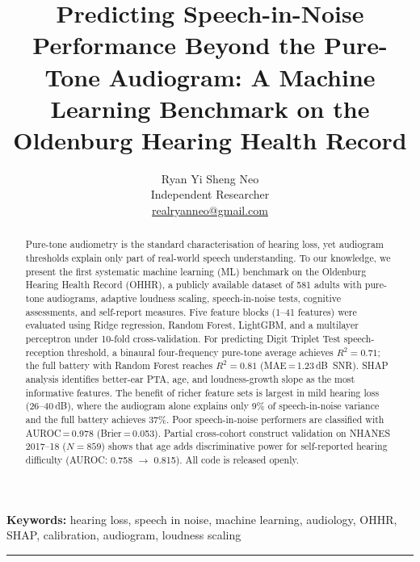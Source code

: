 \documentclass[12pt,a4paper]{article}
\begin{document}
\title{\textbf{Predicting Speech-in-Noise Performance Beyond the Pure-Tone
Audiogram: A Machine Learning Benchmark on the Oldenburg Hearing Health
Record}}

\author{Ryan Yi Sheng Neo\\[0.4em]
\small Independent Researcher\\[0.2em]
\small \href{mailto:realryanneo@gmail.com}{realryanneo@gmail.com}}
\date{}
\maketitle

\begin{abstract}
Pure-tone audiometry is the standard characterisation of hearing loss, yet
audiogram thresholds explain only part of real-world speech understanding.
To our knowledge, we present the first systematic machine learning (ML)
benchmark on the Oldenburg Hearing Health Record (OHHR), a publicly available
dataset of 581 adults with pure-tone audiograms, adaptive loudness scaling,
speech-in-noise tests, cognitive assessments, and self-report measures.
Five feature blocks (1--41 features) were evaluated using Ridge regression,
Random Forest, LightGBM, and a multilayer perceptron under 10-fold
cross-validation.  For predicting Digit Triplet Test speech-reception
threshold, a binaural four-frequency pure-tone average achieves $R^2=0.71$;
the full battery with Random Forest reaches $R^2=0.81$
(MAE\,=\,1.23\,dB~SNR).  SHAP analysis identifies better-ear PTA, age, and
loudness-growth slope as the most informative features.  The benefit of
richer feature sets is largest in mild hearing loss (26--40\,dB), where the
audiogram alone explains only 9\% of speech-in-noise variance and the full
battery achieves 37\%.  Poor speech-in-noise performers are classified with
AUROC\,=\,0.978 (Brier\,=\,0.053).  Partial cross-cohort construct validation on NHANES
2017--18 ($N=859$) shows that age adds discriminative power for
self-reported hearing difficulty (AUROC: 0.758 $\to$ 0.815).  All code is
released openly.
\end{abstract}

\textbf{Keywords:} hearing loss, speech in noise, machine learning,
audiology, OHHR, SHAP, calibration, audiogram, loudness scaling

\vspace{1em}
\hrule
\vspace{1em}
\end{document}

